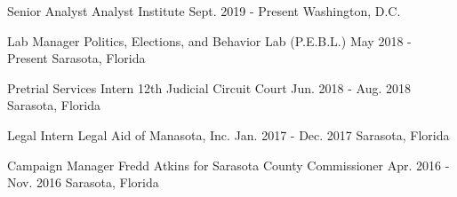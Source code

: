 

\begin{cventries}

    \cventry
      {Senior Analyst} %
      {Analyst Institute} %
      {Sept. 2019 - Present} %
      {Washington, D.C.} %
      {}

  \vspace{-.25cm}

  \cventry
    {Lab Manager} %
    {Politics, Elections, and Behavior Lab (P.E.B.L.)} %
    {May 2018 - Present} %
    {Sarasota, Florida} %
    {}

\vspace{-.25cm}
  \cventry
    {Pretrial Services Intern} %
    {12th Judicial Circuit Court} %
    {Jun. 2018 - Aug. 2018} %
    {Sarasota, Florida} %
    {}

\vspace{-.25cm}
  \cventry
    {Legal Intern} %
    {Legal Aid of Manasota, Inc.} %
    {Jan. 2017 - Dec. 2017} %
    {Sarasota, Florida} %
    {}

\vspace{-.25cm}
  \cventry
    {Campaign Manager} %
    {Fredd Atkins for Sarasota County Commissioner} %
    {Apr. 2016 - Nov. 2016} %
    {Sarasota, Florida} %
    {}

\vspace{-.25cm}
\end{cventries}
